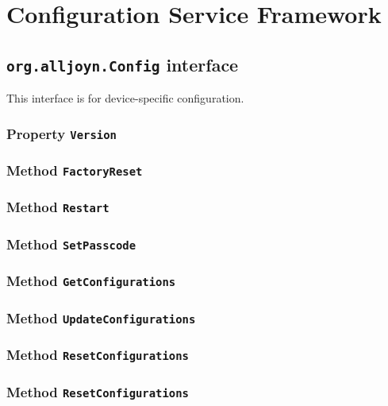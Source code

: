 \documentclass{note}
\begin{document}
\section{Configuration Service Framework}
\subsection{{\bf\texttt{org.alljoyn.Config}} interface} 
This interface is for device-specific configuration.

\subsubsection{Property {\bf\texttt{Version}}}
\subsubsection{Method {\bf\texttt{FactoryReset}}}
\subsubsection{Method {\bf\texttt{Restart}}}
\subsubsection{Method {\bf\texttt{SetPasscode}}}
\subsubsection{Method {\bf\texttt{GetConfigurations}}}
\subsubsection{Method {\bf\texttt{UpdateConfigurations}}}
\subsubsection{Method {\bf\texttt{ResetConfigurations}}}
\subsubsection{Method {\bf\texttt{ResetConfigurations}}}
\end{document}
